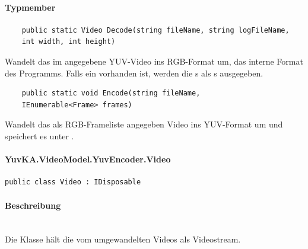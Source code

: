 \paragraph{Typmember}
\begin{itemize}

	\begin{verbatim}
	public static Video Decode(string fileName, string logFileName,
    int width, int height)
	\end{verbatim}
	Wandelt das im  angegebene YUV-Video ins RGB-Format um, das interne Format des Programms.  Falls ein  vorhanden ist, werden die s als s ausgegeben.

	\begin{verbatim}
	public static void Encode(string fileName,
    IEnumerable<Frame> frames)
	\end{verbatim}
	Wandelt das als RGB-Frameliste angegeben Video ins YUV-Format um und speichert es unter . 

\end{itemize}

\setcounter{secnumdepth}{4}
\paragraph{YuvKA.VideoModel.YuvEncoder.Video}
\setcounter{secnumdepth}{3}

\begin{verbatim}
public class Video : IDisposable
\end{verbatim}

\paragraph{Beschreibung}~\\
Die Klasse  hält die vom  umgewandelten Videos als Videostream.

